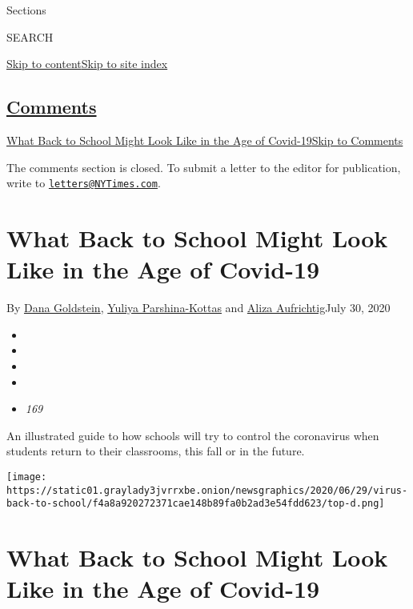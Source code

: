Sections

SEARCH

\protect\hyperlink{site-content}{Skip to
content}\protect\hyperlink{site-index}{Skip to site index}

\hypertarget{comments}{%
\subsection{\texorpdfstring{\protect\hyperlink{commentsContainer}{Comments}}{Comments}}\label{comments}}

\href{}{What Back to School Might Look Like in the Age of
Covid-19}\href{}{Skip to Comments}

The comments section is closed. To submit a letter to the editor for
publication, write to
\href{mailto:letters@NYTimes.com}{\nolinkurl{letters@NYTimes.com}}.

\hypertarget{what-back-to-school-might-look-like-in-the-age-of-covid-19}{%
\section{What Back to School Might Look Like in the Age of
Covid-19}\label{what-back-to-school-might-look-like-in-the-age-of-covid-19}}

By \href{https://www.nytimes3xbfgragh.onion/by/dana-goldstein}{Dana
Goldstein},
\href{https://www.nytimes3xbfgragh.onion/by/yuliya-parshina-kottas}{Yuliya
Parshina-Kottas} and
\href{https://www.nytimes3xbfgragh.onion/by/aliza-aufrichtig}{Aliza
Aufrichtig}July 30, 2020

\begin{itemize}
\item
\item
\item
\item
\item
  \emph{169}
\end{itemize}

An illustrated guide to how schools will try to control the coronavirus
when students return to their classrooms, this fall or in the future.

\texttt{[image: https://static01.graylady3jvrrxbe.onion/newsgraphics/2020/06/29/virus-back-to-school/f4a8a920272371cae148b89fa0b2ad3e54fdd623/top-d.png]}

\hypertarget{what-back-to-school-might-look-like-in-the-age-of-covid-19-1}{%
\section{What Back to School Might Look Like in the Age of
Covid-19}\label{what-back-to-school-might-look-like-in-the-age-of-covid-19-1}}

